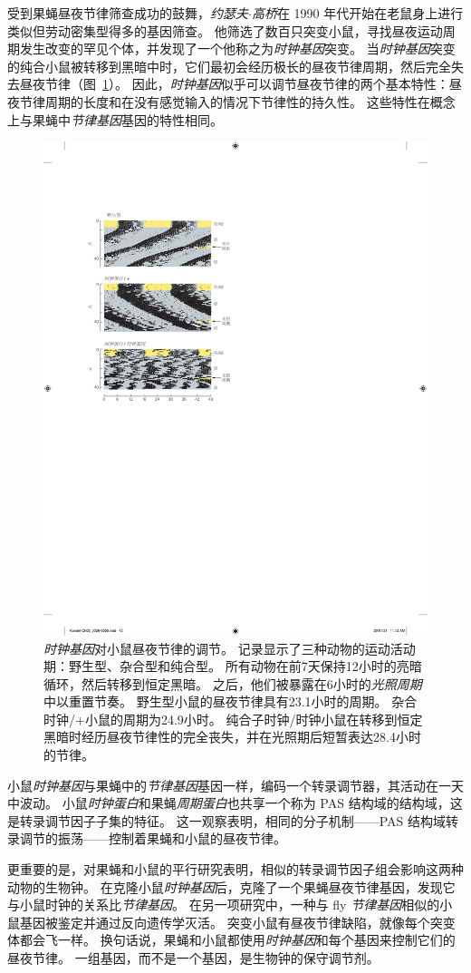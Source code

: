 受到果蝇昼夜节律筛查成功的鼓舞，\textit{约瑟夫$\cdot$高桥}在 1990 年代开始在老鼠身上进行类似但劳动密集型得多的基因筛查。
他筛选了数百只突变小鼠，寻找昼夜运动周期发生改变的罕见个体，并发现了一个他称之为\textit{时钟基因}突变。
当\textit{时钟基因}突变的纯合小鼠被转移到黑暗中时，它们最初会经历极长的昼夜节律周期，然后完全失去昼夜节律（图~\ref{fig:2_12}）。
因此，\textit{时钟基因}似乎可以调节昼夜节律的两个基本特性：昼夜节律周期的长度和在没有感觉输入的情况下节律性的持久性。
这些特性在概念上与果蝇中\textit{节律基因}基因的特性相同。


\begin{figure}[htbp]
	\centering
	\includegraphics[width=0.55\linewidth]{chap02/fig_2_12}
	\caption{\textit{时钟基因}对小鼠昼夜节律的调节。
		记录显示了三种动物的运动活动期：野生型、杂合型和纯合型。
		所有动物在前7天保持12小时的亮暗循环，然后转移到恒定黑暗。
		之后，他们被暴露在6小时的\textit{光照周期}中以重置节奏。
		野生型小鼠的昼夜节律具有23.1小时的周期。
		杂合时钟/+小鼠的周期为24.9小时。
		纯合子时钟/时钟小鼠在转移到恒定黑暗时经历昼夜节律性的完全丧失，并在光照期后短暂表达28.4小时的节律\cite{takahashi1994forward}。}
	\label{fig:2_12}
\end{figure}


小鼠\textit{时钟基因}与果蝇中的\textit{节律基因}基因一样，编码一个转录调节器，其活动在一天中波动。
小鼠\textit{时钟蛋白}和果蝇\textit{周期蛋白}也共享一个称为 PAS 结构域的结构域，这是转录调节因子子集的特征。
这一观察表明，相同的分子机制——PAS 结构域转录调节的振荡——控制着果蝇和小鼠的昼夜节律。


更重要的是，对果蝇和小鼠的平行研究表明，相似的转录调节因子组会影响这两种动物的生物钟。
在克隆小鼠\textit{时钟基因}后，克隆了一个果蝇昼夜节律基因，发现它与小鼠时钟的关系比\textit{节律基因}。
在另一项研究中，一种与 fly \textit{节律基因}相似的小鼠基因被鉴定并通过反向遗传学灭活。
突变小鼠有昼夜节律缺陷，就像每个突变体都会飞一样。 
换句话说，果蝇和小鼠都使用\textit{时钟基因}和每个基因来控制它们的昼夜节律。
一组基因，而不是一个基因，是生物钟的保守调节剂。


